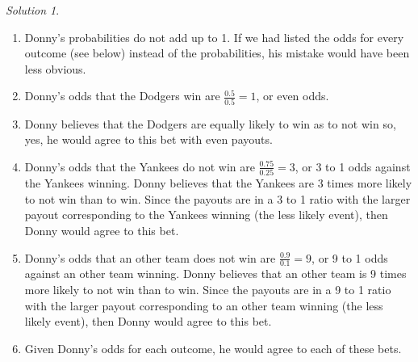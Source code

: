\documentclass[
  letterpaper,
  DIV=11,
  numbers=noendperiod]{scrreprt}
\theoremstyle{plain}
\theoremstyle{definition}
\theoremstyle{definition}
\theoremstyle{definition}
\theoremstyle{remark}
\newtheorem{refsolution}{Solution}[chapter]
\begin{document}

\begin{tcolorbox}[enhanced jigsaw, opacityback=0, rightrule=.15mm, coltitle=black, colframe=quarto-callout-tip-color-frame, toprule=.15mm, colbacktitle=quarto-callout-tip-color!10!white, opacitybacktitle=0.6, left=2mm, toptitle=1mm, breakable, title={Solution (click to expand)}, bottomtitle=1mm, colback=white, leftrule=.75mm, titlerule=0mm, arc=.35mm, bottomrule=.15mm]

\begin{refsolution}
\leavevmode

\begin{enumerate}
\def\labelenumi{\arabic{enumi}.}
\item
  Donny's probabilities do not add up to 1. If we had listed the odds
  for every outcome (see below) instead of the probabilities, his
  mistake would have been less obvious.
\item
  Donny's odds that the Dodgers win are \(\frac{0.5}{0.5}=1\), or even
  odds.
\item
  Donny believes that the Dodgers are equally likely to win as to not
  win so, yes, he would agree to this bet with even payouts.
\item
  Donny's odds that the Yankees do not win are \(\frac{0.75}{0.25}=3\),
  or 3 to 1 odds against the Yankees winning. Donny believes that the
  Yankees are 3 times more likely to not win than to win. Since the
  payouts are in a 3 to 1 ratio with the larger payout corresponding to
  the Yankees winning (the less likely event), then Donny would agree to
  this bet.
\item
  Donny's odds that an other team does not win are
  \(\frac{0.9}{0.1}=9\), or 9 to 1 odds against an other team winning.
  Donny believes that an other team is 9 times more likely to not win
  than to win. Since the payouts are in a 9 to 1 ratio with the larger
  payout corresponding to an other team winning (the less likely event),
  then Donny would agree to this bet.
\item
  Given Donny's odds for each outcome, he would agree to each of these
  bets.


\end{enumerate}
\end{refsolution}
\end{tcolorbox}
\end{document}
